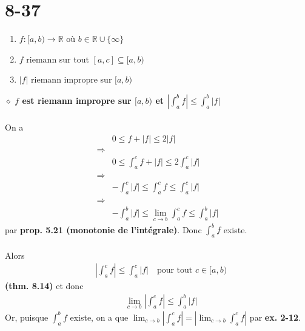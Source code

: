 \documentclass[a4paper,10pt]{article}
\begin{document}
\section*{8-37}
\begin{enumerate}
 \item $f:[a,b) \rightarrow \mathbb{R}$ où $b \in \mathbb{R} \cup \{\infty\}$
 \item $f$ riemann sur tout $[a,c] \subseteq [a,b)$
 \item $|f|$ riemann impropre sur $[a,b)$
\end{enumerate}
$\diamond$ \textbf{$f$ est riemann impropre sur $[a,b)$ et $\left| \int_a^b f \right| \leq \int_a^b |f|$}
\\
\\
On a 
\begin{align*}
 & 0 \leq f + |f| \leq 2|f| \\
 \Rightarrow \\
 & 0 \leq \int_a^c f + |f| \leq 2 \int_a^c |f| \\
 \Rightarrow \\
 & -\int_a^c |f| \leq \int_a^c f \leq \int_a^c |f| \\
 \Rightarrow \\
 & -\int_a^b |f| \leq \lim_{c \to b} \int_a^c f \leq \int_a^b |f|
\end{align*}
par \textbf{prop. 5.21 (monotonie de l'intégrale)}. Donc $\int_a^b f$ existe. 
\\
\\
Alors 
\begin{align*}
 & \left|\int_a^c f\right| \leq \int_a^c |f| \quad \text{pour tout $c \in [a,b)$} 
\end{align*}
\textbf{(thm. 8.14)} et donc 
\begin{align*}
 & \lim_{c \to b}\left|\int_a^c f \right| \leq \int_a^b |f|
\end{align*}
Or, puisque $\int_a^b f$ existe, on a que $\lim_{c \to b} \left |\int_a^c f\right| = \left| \lim_{c \to b} \int_a^c f \right |$ par 
\textbf{ex. 2-12}.
\end{document}
